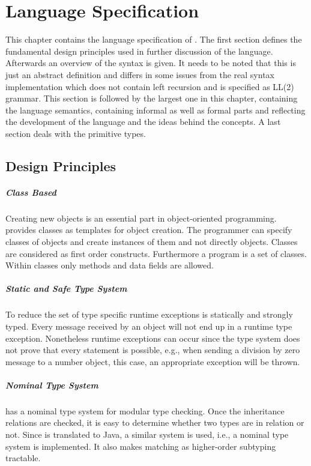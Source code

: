 \chapter{Language Specification}
\label{ctr:languageSpecification}
This chapter contains the language specification of \ooplss.  The first
section defines the fundamental design principles used in further
discussion of the language. Afterwards an overview of the syntax is
given. It needs to be noted that this is just an abstract definition and
differs in some issues from the real syntax implementation which does not
contain left recursion and is specified as LL(2) grammar. This section
is followed by the largest one in this chapter, containing the language
semantics, containing informal as well as formal parts and reflecting
the development of the language and the ideas behind the concepts. A
last section deals with the primitive types.

\section{Design Principles}
\paragraph{Class Based}
Creating new objects is an essential part in object-oriented
programming. \ooplss provides classes as templates for object
creation. The programmer can specify classes of objects and create
instances of them and not directly objects. Classes are considered as
first order constructs. Furthermore a program is a set of classes. Within
classes only methods and data fields are allowed.

\paragraph{Static and Safe Type System}
To reduce the set of type specific runtime exceptions \ooplss is
statically and strongly typed. Every message received by an object will
not end up in a runtime type exception. Nonetheless runtime exceptions
can occur since the type system does not prove that every statement
is possible, e.g., when sending a division by zero message to a number
object, this case, an appropriate exception will be thrown.

\paragraph{Nominal Type System}
\ooplss has a nominal type system for modular type checking. Once the
inheritance relations are checked, it is easy to determine whether
two types are in relation or not. Since \ooplss is translated to Java,
a similar system is used, i.e., a nominal type system is implemented.
It also makes matching as higher-order subtyping tractable.

